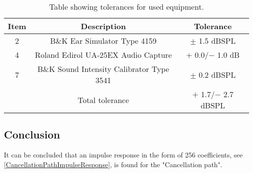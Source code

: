 \begin{table}[H]
	\centering
	\begin{tabular}{ c c c } \toprule
		{Item}	& 		{Description} 	& {Tolerance}	 \\ \bottomrule 
		2	&	B\&K Ear Simulator Type 4159				& $\pm$ 1.5 dBSPL\cite{BK4159Tol} 	\\
		4	&	Roland Edirol UA-25EX Audio Capture			& $+$ 0.0/$-$ 1.0  dB\cite{UA25EXTol}	\\
		7	&	B\&K Sound Intensity Calibrator Type 3541	& $\pm$ 0.2	 dBSPL\cite{BK3541Tol} \\ \bottomrule
			&	Total tolerance								& $+$ 1.7/$-$ 2.7 dBSPL	\\ \bottomrule	
	\end{tabular}
	\caption{Table showing tolerances for used equipment.}
	\label{TolerancesCP}
\end{table}

\subsection{Conclusion}
It can be concluded that an impulse response in the form of 256 coefficients, see \autoref{CancellationPathImpulseResponse}, is found for the "Cancellation path". %

